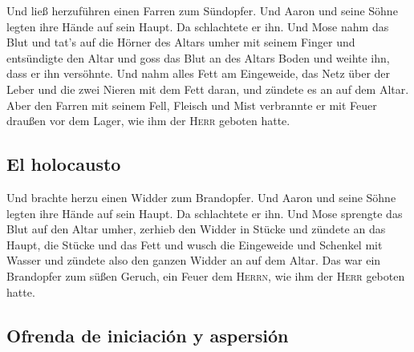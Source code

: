  Und ließ herzuführen einen Farren zum Sündopfer. Und
Aaron und seine Söhne legten ihre Hände auf sein Haupt. 
Da schlachtete er ihn. Und Mose nahm das Blut und tat's auf die Hörner
des Altars umher mit seinem Finger und entsündigte den Altar und goss
das Blut an des Altars Boden und weihte ihn, dass er ihn versöhnte.
 Und nahm alles Fett am Eingeweide, das Netz über der
Leber und die zwei Nieren mit dem Fett daran, und zündete es an auf dem
Altar.  Aber den Farren mit seinem Fell, Fleisch und Mist
verbrannte er mit Feuer draußen vor dem Lager, wie ihm der \textsc{Herr}
geboten hatte.

\hypertarget{el-holocausto}{%
\subsection{El holocausto}\label{el-holocausto}}

 Und brachte herzu einen Widder zum Brandopfer. Und Aaron
und seine Söhne legten ihre Hände auf sein Haupt.  Da
schlachtete er ihn. Und Mose sprengte das Blut auf den Altar umher,
 zerhieb den Widder in Stücke und zündete an das Haupt,
die Stücke und das Fett  und wusch die Eingeweide und
Schenkel mit Wasser und zündete also den ganzen Widder an auf dem Altar.
Das war ein Brandopfer zum süßen Geruch, ein Feuer dem \textsc{Herrn},
wie ihm der \textsc{Herr} geboten hatte.

\hypertarget{ofrenda-de-iniciaciuxf3n-y-aspersiuxf3n}{%
\subsection{Ofrenda de iniciación y
aspersión}\label{ofrenda-de-iniciaciuxf3n-y-aspersiuxf3n}}

